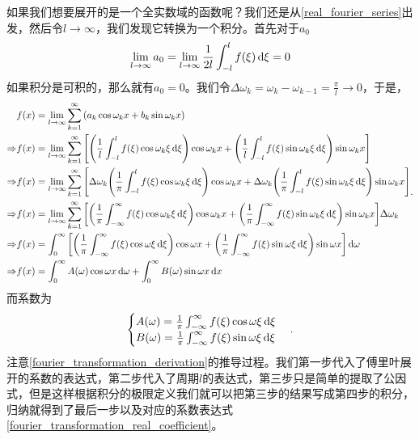 \documentclass[12pt,a4paper,openany,twoside]{book}
\numberwithin{equation}{section}
\begin{document}
    如果我们想要展开的是一个全实数域的函数呢？我们还是从\ref{real_fourier_series}出发，然后令$l\to\infty$，我们发现它转换为一个积分。首先对于$a_0$
    \begin{equation}
      \lim_{l\to\infty}{a_0}=\lim_{l\to\infty}{\frac{1}{2l}\int_{-l}^{l}{f\qty(\xi)\dd{\xi}}}=0
    \end{equation}
    如果积分是可积的，那么就有$a_0=0$。我们令$\Delta\omega_k=\omega_k-\omega_{k-1}=\frac{\pi}{l}\to0$，于是，
    \begin{equation}
      \label{fourier_transformation_derivation}
      \begin{aligned}
        &f\qty(x)=\lim_{l\to\infty}\sum_{k=1}^{\infty}{\qty(a_k\cos{\omega_k x}+b_k\sin{\omega_k x})}\\
        \Rightarrow&f\qty(x)=\lim_{l\to\infty}{\sum_{k=1}^{\infty}{\qty[\qty(\frac{1}{l}\int_{-l}^l{f\qty(\xi)\cos{\omega_k\xi}\dd{\xi}})\cos{\omega_k x}+\qty(\frac{1}{l}\int_{-l}^l{f\qty(\xi)\sin{\omega_k\xi}\dd{\xi}})\sin{\omega_k x}]}}\\
        \Rightarrow&f\qty(x)=\lim_{l\to\infty}{\sum_{k=1}^{\infty}{\qty[\Delta\omega_k\qty(\frac{1}{\pi}\int_{-l}^l{f\qty(\xi)\cos{\omega_k\xi}\dd{\xi}})\cos{\omega_k x}+\Delta\omega_k\qty(\frac{1}{\pi}\int_{-l}^l{f\qty(\xi)\sin{\omega_k\xi}\dd{\xi}})\sin{\omega_k x}]}}\\
        \Rightarrow&f\qty(x)=\lim_{l\to\infty}{\sum_{k=1}^{\infty}{\qty[\qty(\frac{1}{\pi}\int_{-\infty}^\infty{f\qty(\xi)\cos{\omega_k\xi}\dd{\xi}})\cos{\omega_k x}+\qty(\frac{1}{\pi}\int_{-\infty}^\infty{f\qty(\xi)\sin{\omega_k\xi}\dd{\xi}})\sin{\omega_k x}]\Delta\omega_k}}\\
        \Rightarrow&f\qty(x)=\int_0^\infty{\qty[\qty(\frac{1}{\pi}\int_{-\infty}^\infty{f\qty(\xi)\cos{\omega\xi}\dd{\xi}})\cos{\omega x}+\qty(\frac{1}{\pi}\int_{-\infty}^\infty{f\qty(\xi)\sin{\omega\xi}\dd{\xi}})\sin{\omega x}]\dd{\omega}}\\
        \Rightarrow&f\qty(x)=\int_0^\infty{A\qty(\omega)\cos{\omega x}\dd{\omega}}+\int_0^\infty{B\qty(\omega)\sin{\omega x}\dd{x}}
      \end{aligned}  
      .
    \end{equation}
    而系数为
    \begin{equation}
      \begin{cases}
        \label{fourier_transformation_real_coefficient}
        A\qty(\omega)=\frac{1}{\pi}\int^\infty_{-\infty}{f\qty(\xi)\cos{\omega\xi}\dd{\xi}}\\
        B\qty(\omega)=\frac{1}{\pi}\int^\infty_{-\infty}{f\qty(\xi)\sin{\omega\xi}\dd{\xi}} 
      \end{cases}
      .
    \end{equation}
    注意\ref{fourier_transformation_derivation}的推导过程。我们第一步代入了傅里叶展开的系数的表达式，第二步代入了周期$l$的表达式，第三步只是简单的提取了公因式，但是这样根据积分的极限定义我们就可以把第三步的结果写成第四步的积分，归纳就得到了最后一步以及对应的系数表达式\ref{fourier_transformation_real_coefficient}。
\end{document}
